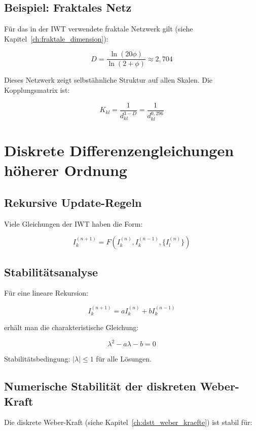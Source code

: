 \subsection{Beispiel: Fraktales Netz}
\label{sub:mathematik_fraktales_netz}

Für das in der IWT verwendete fraktale Netzwerk gilt (siehe Kapitel~\ref{ch:fraktale_dimension}):

\[
D = \frac{\ln(20\phi)}{\ln(2 + \phi)} \approx 2,704
\]

Dieses Netzwerk zeigt selbstähnliche Struktur auf allen Skalen. Die Kopplungsmatrix ist:

\[
K_{kl} = \frac{1}{d_{kl}^{3-D}} = \frac{1}{d_{kl}^{0,296}}
\]

\section{Diskrete Differenzengleichungen höherer Ordnung}
\label{app:mathematik_differenzengleichungen}

\subsection{Rekursive Update-Regeln}
\label{sub:mathematik_update}

Viele Gleichungen der IWT haben die Form:

\[
I_k^{(n+1)} = F\left( I_k^{(n)}, I_k^{(n-1)}, \{I_l^{(n)}\} \right)
\]

\subsection{Stabilitätsanalyse}
\label{sub:mathematik_stabilitaet}

Für eine lineare Rekursion:

\[
I_k^{(n+1)} = a I_k^{(n)} + b I_k^{(n-1)}
\]

erhält man die charakteristische Gleichung:

\[
\lambda^2 - a\lambda - b = 0
\]

Stabilitätsbedingung: \( |\lambda| \leq 1 \) für alle Lösungen.

\subsection{Numerische Stabilität der diskreten Weber-Kraft}
\label{sub:mathematik_weber_stabil}

Die diskrete Weber-Kraft (siehe Kapitel~\ref{ch:dstt_weber_kraefte}) ist stabil für:

